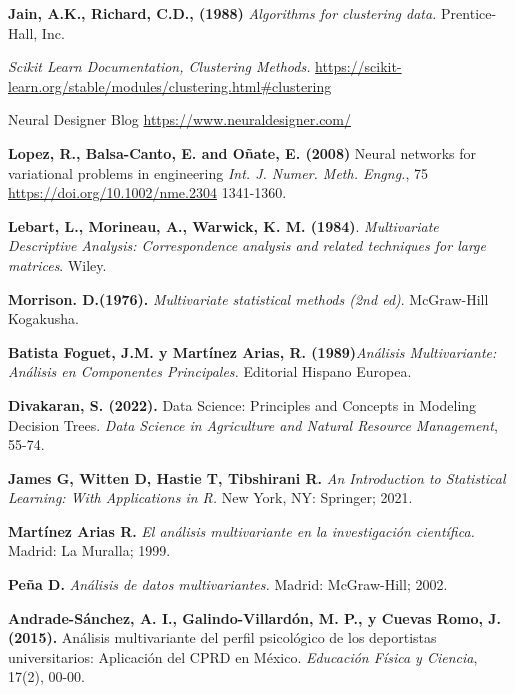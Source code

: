 \begin{thebibliography}{99}
 \textbf{Jain, A.K., Richard, C.D., (1988)} \textit{Algorithms for clustering data.} Prentice-Hall, Inc. 

 \textit{Scikit Learn Documentation, Clustering Methods. } \url{https://scikit-learn.org/stable/modules/clustering.html#clustering}


 Neural Designer Blog \url{https://www.neuraldesigner.com/}
          
 \textbf{Lopez, R., Balsa-Canto, E. and Oñate, E. (2008)}  Neural networks for variational problems in engineering \emph{Int. J. Numer. Meth. Engng.}, 75\\ \url{https://doi.org/10.1002/nme.2304} 1341-1360. 


\textbf{Lebart, L., Morineau, A.,  Warwick, K. M. (1984)}.\textit{ Multivariate Descriptive Analysis: Correspondence analysis and related techniques for large matrices}. Wiley.

\textbf{Morrison. D.(1976).}\textit{ Multivariate statistical methods (2nd ed)}. McGraw-Hill Kogakusha.

\textbf{Batista Foguet, J.M. y Martínez Arias, R. (1989)}\textit{Análisis Multivariante: Análisis en Componentes Principales. } Editorial Hispano Europea.

\textbf{Divakaran, S. (2022). }Data Science: Principles and Concepts in Modeling Decision Trees.\emph{ Data Science in Agriculture and Natural Resource Management}, 55-74.

\textbf{James G, Witten D, Hastie T, Tibshirani R.} \emph{An Introduction to Statistical Learning: With Applications in R.} New York, NY: Springer; 2021. 
  


\textbf{Martínez Arias R.} \emph{El análisis multivariante en la investigación científica.} Madrid: La Muralla; 1999. 
  


\textbf{Peña D.} \emph{Análisis de datos multivariantes.} Madrid: McGraw-Hill; 2002.

\textbf{Andrade-Sánchez, A. I., Galindo-Villardón, M. P., y Cuevas Romo, J. (2015).} Análisis multivariante del perfil psicológico de los deportistas universitarios: Aplicación del CPRD en México. \emph{Educación Física y Ciencia}, 17(2), 00-00.


\end{thebibliography}
